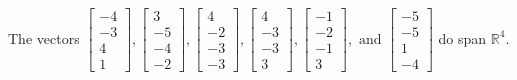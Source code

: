 \begin{exercise}
\begin{exerciseStatement}
  \end{exerciseStatement}
  \begin{exerciseAnswer}
   The vectors \(\left[\begin{array}{r}
-4 \\
-3 \\
4 \\
1
\end{array}\right] , \left[\begin{array}{r}
3 \\
-5 \\
-4 \\
-2
\end{array}\right] , \left[\begin{array}{r}
4 \\
-2 \\
-3 \\
-3
\end{array}\right] , \left[\begin{array}{r}
4 \\
-3 \\
-3 \\
3
\end{array}\right] , \left[\begin{array}{r}
-1 \\
-2 \\
-1 \\
3
\end{array}\right] , \text{ and } \left[\begin{array}{r}
-5 \\
-5 \\
1 \\
-4
\end{array}\right]\) 
  	 do  
	span \(\mathbb{R}^4\).
  


  \end{exerciseAnswer}
\end{exercise}